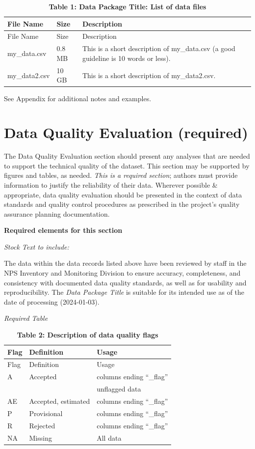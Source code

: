 \documentclass[
]{article}
\begin{document}
\begin{longtable}[]{@{}lll@{}}
\caption{\textbf{Table 1: Data Package Title: List of data
files}}\tabularnewline
\toprule\noalign{}
File Name & Size & Description \\
\midrule\noalign{}
\endfirsthead
\toprule\noalign{}
File Name & Size & Description \\
\midrule\noalign{}
\endhead
\bottomrule\noalign{}
\endlastfoot
my\_data.csv & 0.8 MB & This is a short description of my\_data.csv (a
good guideline is 10 words or less). \\
my\_data2.csv & 10 GB & This is a short description of my\_data2.csv. \\
\end{longtable}

See Appendix for additional notes and examples.

\hypertarget{data-quality-evaluation-required}{%
\section{Data Quality Evaluation
(required)}\label{data-quality-evaluation-required}}

The Data Quality Evaluation section should present any analyses that are
needed to support the technical quality of the dataset. This section may
be supported by figures and tables, as needed. \emph{This is a required
section}; authors must provide information to justify the reliability of
their data. Wherever possible \& appropriate, data quality evaluation
should be presented in the context of data standards and quality control
procedures as prescribed in the project's quality assurance planning
documentation.

\textbf{Required elements for this section}

\emph{Stock Text to include:}

The data within the data records listed above have been reviewed by
staff in the NPS Inventory and Monitoring Division to ensure accuracy,
completeness, and consistency with documented data quality standards, as
well as for usability and reproducibility. The \emph{Data Package Title}
is suitable for its intended use as of the date of processing
(2024-01-03).

\emph{Required Table}

\begin{longtable}[]{@{}lll@{}}
\caption{\textbf{Table 2: Description of data quality
flags}}\tabularnewline
\toprule\noalign{}
Flag & Definition & Usage \\
\midrule\noalign{}
\endfirsthead
\toprule\noalign{}
Flag & Definition & Usage \\
\midrule\noalign{}
\endhead
\bottomrule\noalign{}
\endlastfoot
A & Accepted & columns ending ``\_flag'' \\
& & unflagged data \\
AE & Accepted, estimated & columns ending ``\_flag'' \\
P & Provisional & columns ending ``\_flag'' \\
R & Rejected & columns ending ``\_flag'' \\
NA & Missing & All data \\
\end{longtable}
\end{document}
